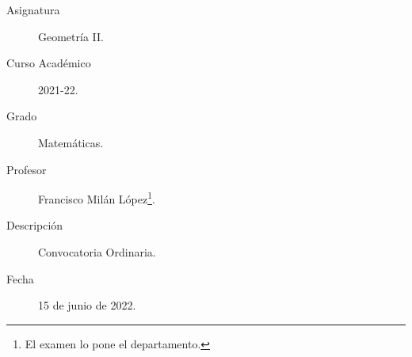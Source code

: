 \documentclass[12pt]{article}
\begin{document}

    
    

    \begin{description}
        \item[Asignatura] Geometría II.
        \item[Curso Académico] 2021-22.
        \item[Grado] Matemáticas.
        \item[Profesor] Francisco Milán López\footnote{El examen lo pone el departamento.}.
        \item[Descripción] Convocatoria Ordinaria.
        \item[Fecha] 15 de junio de 2022.
    
    \end{description}
    \newpage
    
\end{document}
